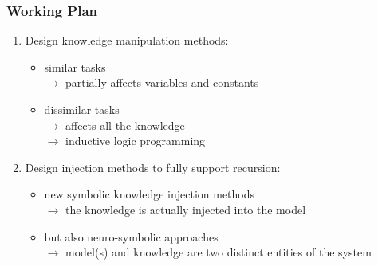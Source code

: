 \documentclass[presentation]{beamer}\mode<presentation>{\usetheme{blackAMSBolognaFC}}
\begin{document}
\begin{frame}
\frametitle{Working Plan}

    \begin{enumerate}
        \item  Design knowledge manipulation methods:
        \begin{itemize}
            \item similar tasks\\ $\rightarrow$ partially affects variables and constants
            \item dissimilar tasks\\ $\rightarrow$ affects all the knowledge\\  $\rightarrow$ inductive logic programming~
        \end{itemize}
        \vfill
        \item Design injection methods to fully support recursion:
        \begin{itemize}
            \item new symbolic knowledge injection methods\\ $\rightarrow$ the knowledge is actually injected into the model
            \item but also neuro-symbolic approaches\\ $\rightarrow$ model(s) and knowledge are two \alert{distinct entities} of the system
        \end{itemize}

    \end{enumerate}

\end{frame}
\end{document}
